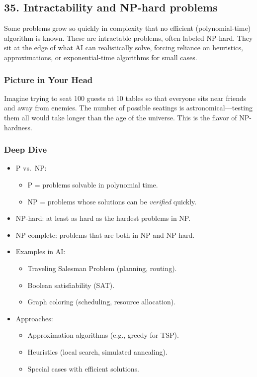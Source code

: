 \documentclass[
  letterpaper,
  DIV=11,
  numbers=noendperiod]{scrreprt}
\providecommand{\tightlist}{%
  \setlength{\itemsep}{0pt}\setlength{\parskip}{0pt}}
\begin{document}
\subsection{35. Intractability and NP-hard
problems}\label{intractability-and-np-hard-problems}

Some problems grow so quickly in complexity that no efficient
(polynomial-time) algorithm is known. These are intractable problems,
often labeled NP-hard. They sit at the edge of what AI can realistically
solve, forcing reliance on heuristics, approximations, or
exponential-time algorithms for small cases.

\subsubsection{Picture in Your Head}\label{picture-in-your-head-34}

Imagine trying to seat 100 guests at 10 tables so that everyone sits
near friends and away from enemies. The number of possible seatings is
astronomical---testing them all would take longer than the age of the
universe. This is the flavor of NP-hardness.

\subsubsection{Deep Dive}\label{deep-dive-34}

\begin{itemize}
\item
  P vs.~NP:

  \begin{itemize}
  \tightlist
  \item
    P = problems solvable in polynomial time.
  \item
    NP = problems whose solutions can be \emph{verified} quickly.
  \end{itemize}
\item
  NP-hard: at least as hard as the hardest problems in NP.
\item
  NP-complete: problems that are both in NP and NP-hard.
\item
  Examples in AI:

  \begin{itemize}
  \tightlist
  \item
    Traveling Salesman Problem (planning, routing).
  \item
    Boolean satisfiability (SAT).
  \item
    Graph coloring (scheduling, resource allocation).
  \end{itemize}
\item
  Approaches:

  \begin{itemize}
  \tightlist
  \item
    Approximation algorithms (e.g., greedy for TSP).
  \item
    Heuristics (local search, simulated annealing).
  \item
    Special cases with efficient solutions.
  \end{itemize}
\end{itemize}
\end{document}
